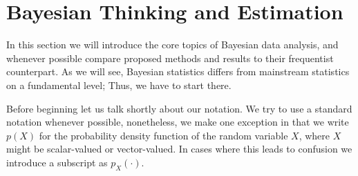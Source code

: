 \section{Bayesian Thinking and Estimation}
In this section we will introduce the core topics of Bayesian data analysis, and whenever possible compare proposed methods and results to their frequentist counterpart.
As we will see, Bayesian statistics differs from mainstream statistics on a fundamental level; Thus, we have to start there.

Before beginning let us talk shortly about our notation.
We try to use a standard notation whenever possible, nonetheless, we make one exception in that we write $p(X)$ for the probability density function of the random variable $X$, where $X$ might be scalar-valued or vector-valued.
In cases where this leads to confusion we introduce a subscript as $p_X(\cdot)$.

